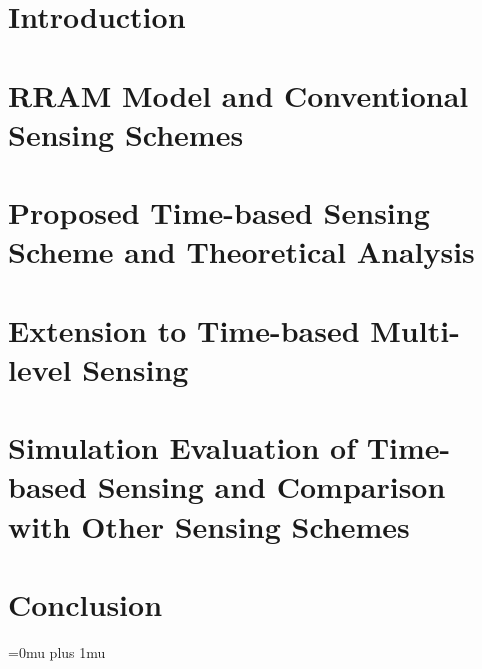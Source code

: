 \documentclass[journal]{IEEEtran}
\begin{document}

\maketitle
\IEEEpeerreviewmaketitle


 


\section{Introduction}
\label{sec_intro}


\section{RRAM Model and Conventional Sensing Schemes}
\label{sec_conv}


\section{Proposed Time-based Sensing Scheme and Theoretical Analysis}
\label{sec_prop}


\section{Extension to Time-based Multi-level Sensing}
\label{sec_features}


\section{Simulation Evaluation of Time-based Sensing and Comparison with Other Sensing Schemes}
\label{sec_results}


% 
% 

\section{Conclusion}
\label{sec_conclusion}


% 





\Urlmuskip=0mu plus 1mu\relax




\end{document}
